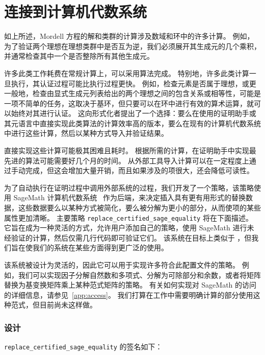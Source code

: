 \documentclass[sigplan,10pt,nonacm,
screen]{acmart} \settopmatter{printfolios=true,printccs=false,printacmref=false}
\begin{document}
\section{连接到计算机代数系统}\label{sec:Sageify}

如上所述，Mordell 方程的解和类群的计算涉及数域和环中的许多计算。
例如，为了验证两个理想在理想类群中是否互为逆，我们必须展开其生成元的几个乘积，并通常检查其中一个是否整除所有其他生成元。

许多此类工作耗费在常规计算上，可以采用算法完成。
特别地，许多此类计算一旦执行，其认证过程可能比执行过程更快。
例如，检查元素是否属于理想，或更一般地，检查由显式生成元列表给出的两个理想之间的包含关系或相等性，可能是一项不简单的任务，这取决于基环，但只要可以在环中进行有效的算术运算，就可以始终对其进行认证。
这向形式化者提出了一个选择：要么在使用的证明助手或其元语言中直接实现此类算法的计算效率高的版本，要么在现有的计算机代数系统中进行这些计算，然后以某种方式导入并验证结果。

直接实现这些计算可能极其困难且耗时。
根据所需的计算，在证明助手中实现最先进的算法可能需要好几个月的时间。
从外部工具导入计算可以在一定程度上通过手动完成，但这会增加大量开销，而且如果涉及的项很大，还会降低可读性。

为了自动执行在证明过程中调用外部系统的过程，我们开发了一个策略，该策略使用 SageMath 计算机代数系统~\cite{sagemath} 作为后端，来决定插入具有更有用形式的替换数据，这些数据要么以某种方式被简化，要么被分解为更小的部分，从而使项的某些属性更加清晰。
主要策略 \lstinline{replace_certified_sage_equality} 将在下面描述。
它旨在成为一种灵活的方式，允许用户添加自己的策略，使用 SageMath 进行未经验证的计算，然后仅需几行代码即可验证它们。
该系统在目标上类似于 \cite{lewis_extensible_2017, lewis_bi-directional_2022}，但我们旨在使我们的系统在某些方面得到更广泛的使用。

该系统被设计为灵活的，因此它可以用于实现许多符合此配置文件的策略。
例如，我们可以实现因子分解自然数和多项式、分解为可除部分和余数，或者将矩阵替换为基变换矩阵乘上某种范式矩阵的策略。
有关如何实现对 SageMath 的访问的详细信息，请参见~\cref{app:access}。
我们打算在工作中需要明确计算的部分使用这种范式，但目前尚未这样做。

\subsubsection*{设计}
\lstinline{replace_certified_sage_equality} 的签名如下：
\end{document}
